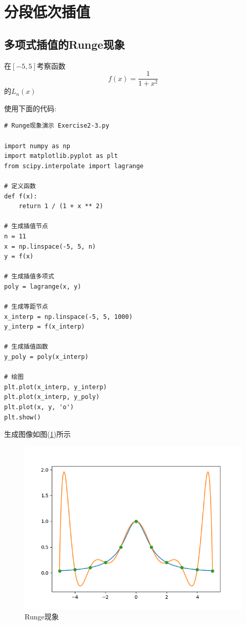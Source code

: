 \section{分段低次插值}

\subsection{多项式插值的Runge现象}

\begin{example}
    在$[-5,5]$考察函数
    \begin{equation*}
        f(x)=\frac{1}{1+x^2}
    \end{equation*}
    的$L_n(x)$
\end{example}

使用下面的代码:

\begin{lstlisting}
# Runge现象演示 Exercise2-3.py

import numpy as np
import matplotlib.pyplot as plt
from scipy.interpolate import lagrange

# 定义函数
def f(x):
    return 1 / (1 + x ** 2)

# 生成插值节点
n = 11
x = np.linspace(-5, 5, n)
y = f(x)

# 生成插值多项式
poly = lagrange(x, y)

# 生成等距节点
x_interp = np.linspace(-5, 5, 1000)
y_interp = f(x_interp)

# 生成插值函数
y_poly = poly(x_interp)

# 绘图
plt.plot(x_interp, y_interp)
plt.plot(x_interp, y_poly)
plt.plot(x, y, 'o')
plt.show()
\end{lstlisting}

生成图像如图(\ref{fig:Runge现象})所示
\begin{figure}[h]
    \centering
    \includegraphics[width=1\linewidth]{Chapter2/graph/python/Figure2-2.png}
    \caption{Runge现象}
    \label{fig:Runge现象}
\end{figure}

